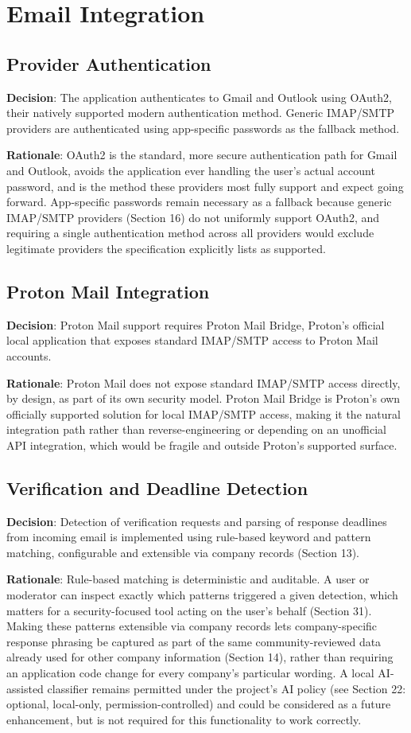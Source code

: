\chapter{Email Integration}

\section{Provider Authentication}
\textbf{Decision}: The application authenticates to Gmail and Outlook using OAuth2, their natively supported modern authentication method. Generic IMAP/SMTP providers are authenticated using app-specific passwords as the fallback method.

\textbf{Rationale}: OAuth2 is the standard, more secure authentication path for Gmail and Outlook, avoids the application ever handling the user's actual account password, and is the method these providers most fully support and expect going forward. App-specific passwords remain necessary as a fallback because generic IMAP/SMTP providers (Section 16) do not uniformly support OAuth2, and requiring a single authentication method across all providers would exclude legitimate providers the specification explicitly lists as supported.
\section{Proton Mail Integration}
\textbf{Decision}: Proton Mail support requires Proton Mail Bridge, Proton's official local application that exposes standard IMAP/SMTP access to Proton Mail accounts.

\textbf{Rationale}: Proton Mail does not expose standard IMAP/SMTP access directly, by design, as part of its own security model. Proton Mail Bridge is Proton's own officially supported solution for local IMAP/SMTP access, making it the natural integration path rather than reverse-engineering or depending on an unofficial API integration, which would be fragile and outside Proton's supported surface.
\section{Verification and Deadline Detection}
\textbf{Decision}: Detection of verification requests and parsing of response deadlines from incoming email is implemented using rule-based keyword and pattern matching, configurable and extensible via company records (Section 13).

\textbf{Rationale}: Rule-based matching is deterministic and auditable. A user or moderator can inspect exactly which patterns triggered a given detection, which matters for a security-focused tool acting on the user's behalf (Section 31). Making these patterns extensible via company records lets company-specific response phrasing be captured as part of the same community-reviewed data already used for other company information (Section 14), rather than requiring an application code change for every company's particular wording. A local AI-assisted classifier remains permitted under the project's AI policy (see Section 22: optional, local-only, permission-controlled) and could be considered as a future enhancement, but is not required for this functionality to work correctly.
